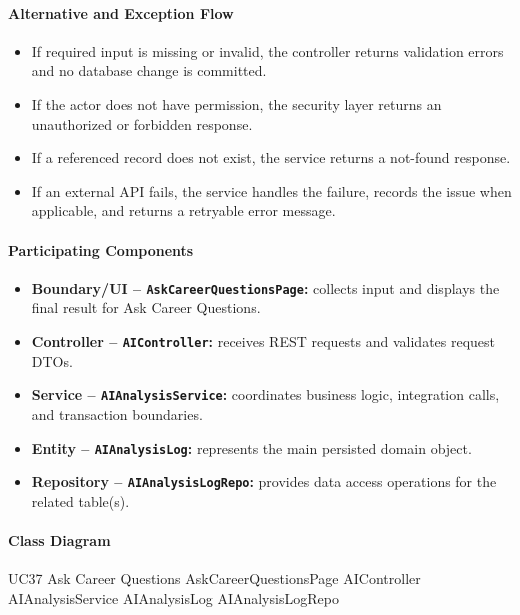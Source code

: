 \paragraph{Alternative and Exception Flow}

\begin{itemize}
    \item If required input is missing or invalid, the controller returns validation errors and no database change is committed.
    \item If the actor does not have permission, the security layer returns an unauthorized or forbidden response.
    \item If a referenced record does not exist, the service returns a not-found response.
    \item If an external API fails, the service handles the failure, records the issue when applicable, and returns a retryable error message.
\end{itemize}

\paragraph{Participating Components}

\begin{itemize}
    \item \textbf{Boundary/UI -- \texttt{AskCareerQuestionsPage}:} collects input and displays the final result for Ask Career Questions.
    \item \textbf{Controller -- \texttt{AIController}:} receives REST requests and validates request DTOs.
    \item \textbf{Service -- \texttt{AIAnalysisService}:} coordinates business logic, integration calls, and transaction boundaries.
    \item \textbf{Entity -- \texttt{AIAnalysisLog}:} represents the main persisted domain object.
    \item \textbf{Repository -- \texttt{AIAnalysisLogRepo}:} provides data access operations for the related table(s).
\end{itemize}

\paragraph{Class Diagram}

\ClassDiagram
{UC37 Ask Career Questions}
{AskCareerQuestionsPage}
{AIController}
{AIAnalysisService}
{AIAnalysisLog}
{AIAnalysisLogRepo}

